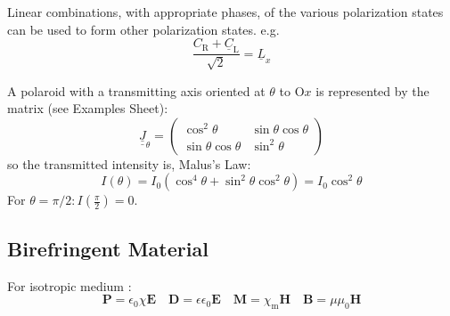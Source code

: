 \documentclass[12pt,a4paper]{article}
\begin{document}
Linear combinations, with appropriate phases, of the various polarization states can be used to form other polarization states. e.g.
$$
\frac{C_{\mathrm{R}}+\underline{C}_{\mathrm{L}}}{\sqrt{2}}=\underline{L}_x
$$

A polaroid with a transmitting axis oriented at $\theta$ to $\mathrm{O} x$ is represented by the matrix (see Examples Sheet):
$$
\underline{\underline{J}}_\theta=\left(\begin{array}{cc}
\cos ^2 \theta & \sin \theta \cos \theta \\
\sin \theta \cos \theta & \sin ^2 \theta
\end{array}\right)
$$
so the transmitted intensity is, Malus's Law:
$$
I(\theta)=I_0\left(\cos ^4 \theta+\sin ^2 \theta \cos ^2 \theta\right)=I_0 \cos ^2 \theta
$$
For $\theta=\pi / 2: I\left(\frac{\pi}{2}\right)=0$.

\subsection{Birefringent Material}
For isotropic medium :
$$
\boldsymbol{P}=\epsilon_0 \chi \boldsymbol{E} \quad \boldsymbol{D}=\epsilon \epsilon_0 \boldsymbol{E} \quad \boldsymbol{M}=\chi_{\mathrm{m}} \boldsymbol{H} \quad \boldsymbol{B}=\mu \mu_0 \boldsymbol{H}
$$
\end{document}

